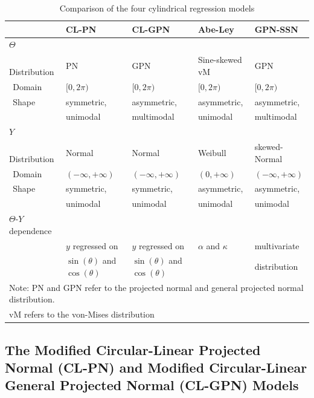 \documentclass[man]{apa6}
\begin{document}
\begin{table}
\centering
\caption{Comparison of the four cylindrical regression models} 
\begin{tabular}{lllll}
  \noalign{\smallskip}\hline\noalign{\smallskip}
\multicolumn{1}{l}{Aspect} & CL-PN & CL-GPN  & Abe-Ley  & GPN-SSN \\ \hline\noalign{\smallskip}
$\Theta$ & &&&\\
$\:\:$Distribution& PN & GPN & Sine-skewed vM & GPN\\
$\:\:$Domain & $[0, 2\pi)$ & $[0, 2\pi)$ & $[0, 2\pi)$ & $[0, 2\pi)$\\
$\:\:$Shape & symmetric, & asymmetric, & asymmetric, & asymmetric, \\
            & unimodal  & multimodal & unimodal   & multimodal \\\hline\noalign{\smallskip}
$Y$& &&&\\
$\:\:$Distribution & Normal & Normal & Weibull & skewed-Normal\\
$\:\:$Domain & $(-\infty, + \infty)$ & $(-\infty, + \infty)$ & $(0, + \infty)$ & $(-\infty, + \infty)$\\
$\:\:$Shape & symmetric, & symmetric, & asymmetric, & asymmetric, \\
            & unimodal  & unimodal  & unimodal   & unimodal\\\hline\noalign{\smallskip}
$\Theta$-$Y$ dependence &                                   &                                   & & \\
                        & $y$ regressed on                  & $y$ regressed on                  & $\alpha$ and $\kappa$ & multivariate \\
                        & $\sin(\theta)$ and $\cos(\theta)$ & $\sin(\theta)$ and $\cos(\theta)$ & & distribution\\\hline
\multicolumn{5}{l}{Note: PN and GPN refer to the projected normal and general projected normal distribution.}\\
\multicolumn{5}{l}{vM refers to the von-Mises distribution}\\

\end{tabular}
\label{TableModels}
\end{table}

\subsection{The Modified Circular-Linear Projected Normal (CL-PN) and Modified Circular-Linear General Projected Normal (CL-GPN) Models}\label{CL-(G)PN}
\end{document}
